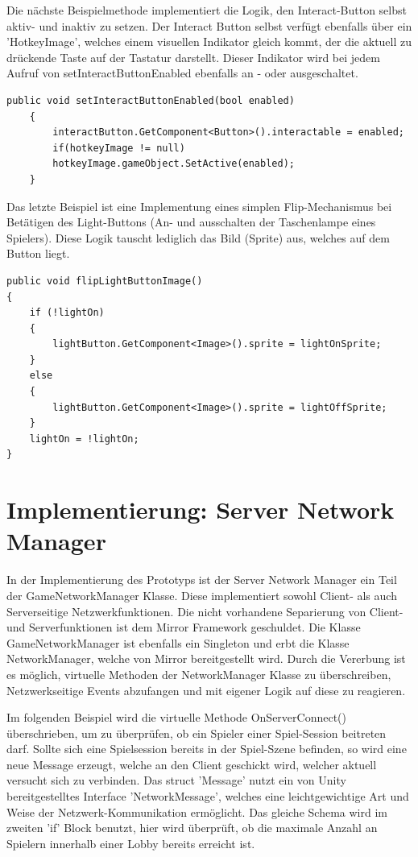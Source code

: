 Die nächste Beispielmethode implementiert die Logik, den Interact-Button selbst aktiv- und inaktiv zu setzen. Der Interact Button selbst verfügt ebenfalls über ein 'HotkeyImage', welches einem visuellen Indikator gleich kommt, der die aktuell zu drückende Taste auf der Tastatur darstellt. Dieser Indikator wird bei jedem Aufruf von setInteractButtonEnabled ebenfalls an - oder ausgeschaltet.

\begin{lstlisting}[caption= InGameUiControllerScript.cs setInteractButtonEnabled]
public void setInteractButtonEnabled(bool enabled)
	{
		interactButton.GetComponent<Button>().interactable = enabled;
		if(hotkeyImage != null)
		hotkeyImage.gameObject.SetActive(enabled);
	}
\end{lstlisting}

Das letzte Beispiel ist eine Implementung eines simplen Flip-Mechanismus bei Betätigen des Light-Buttons (An- und ausschalten der Taschenlampe eines Spielers). Diese Logik tauscht lediglich das Bild (Sprite) aus, welches auf dem Button liegt.

\begin{lstlisting}[caption= InGameUiControllerScript.cs flipLightButtonImage]
public void flipLightButtonImage()
{
	if (!lightOn)
	{
		lightButton.GetComponent<Image>().sprite = lightOnSprite;
	}
	else
	{
		lightButton.GetComponent<Image>().sprite = lightOffSprite;
	}
	lightOn = !lightOn;
}
\end{lstlisting}


\section{Implementierung: Server Network Manager}

In der Implementierung des Prototyps ist der Server Network Manager ein Teil der GameNetworkManager Klasse. Diese implementiert sowohl Client- als auch Serverseitige Netzwerkfunktionen. Die nicht vorhandene Separierung von Client-und Serverfunktionen ist dem Mirror Framework geschuldet. Die Klasse GameNetworkManager ist ebenfalls ein Singleton und erbt die Klasse NetworkManager, welche von Mirror bereitgestellt wird. Durch die Vererbung ist es möglich, virtuelle Methoden\cite{Billwagner.08.02.2022} der NetworkManager Klasse zu überschreiben, Netzwerkseitige Events abzufangen und mit eigener Logik auf diese zu reagieren. 

Im folgenden Beispiel wird die virtuelle Methode OnServerConnect() überschrieben, um zu überprüfen, ob ein Spieler einer Spiel-Session beitreten darf. Sollte sich eine Spielsession bereits in der Spiel-Szene befinden, so wird eine neue Message erzeugt, welche an den Client geschickt wird, welcher aktuell versucht sich zu verbinden. Das struct 'Message' nutzt ein von Unity bereitgestelltes Interface 'NetworkMessage', welches eine leichtgewichtige Art und Weise der Netzwerk-Kommunikation ermöglicht. Das gleiche Schema wird im zweiten 'if' Block benutzt, hier wird überprüft, ob die maximale Anzahl an Spielern innerhalb einer Lobby bereits erreicht ist.

